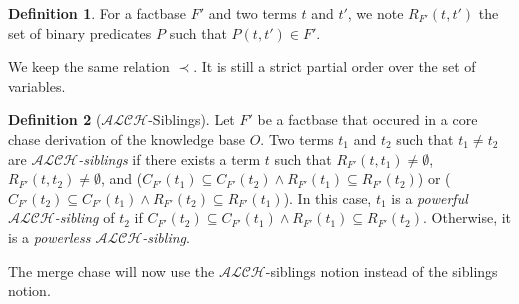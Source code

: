 \documentclass{article}
\theoremstyle{definition}
\newtheorem{definition}{Definition}[section]
\theoremstyle{remark}
\begin{document}
\begin{definition}
For a factbase $F'$ and two terms $t$ and $t'$, we note \emph{$R_{F'}(t,t')$} the set of binary predicates $P$ such that $P(t,t')\in F'$.
\end{definition}

We keep the same relation $\prec$. It is still a strict partial order over the set of variables.

\begin{definition}[$\mathcal{ALCH}$-Siblings]
Let $F'$ be a factbase that occured in a core chase derivation of the knowledge base $O$. Two terms $t_1$ and $t_2$ such that $t_1 \neq t_2$ are \emph{$\mathcal{ALCH}$-siblings} if there exists a term $t$ such that $R_{F'}(t,t_1) \neq \emptyset$, $R_{F'}(t,t_2) \neq \emptyset$, and ($C_{F'}(t_1) \subseteq C_{F'}(t_2) \wedge R_{F'}(t_1) \subseteq R_{F'}(t_2)$) or ($C_{F'}(t_2) \subseteq C_{F'}(t_1) \wedge R_{F'}(t_2) \subseteq R_{F'}(t_1)$). In this case, $t_1$ is a \emph{powerful $\mathcal{ALCH}$-sibling} of $t_2$ if $C_{F'}(t_2) \subseteq C_{F'}(t_1) \wedge R_{F'}(t_1) \subseteq R_{F'}(t_2)$. Otherwise, it is a \emph{powerless $\mathcal{ALCH}$-sibling}.
\end{definition}

The merge chase will now use the $\mathcal{ALCH}$-siblings notion instead of the siblings notion.






\end{document}
